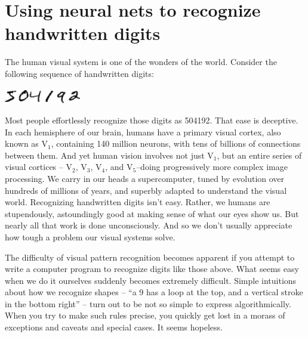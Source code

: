 \documentclass[a4paper,twoside,10pt]{book}
\begin{document}
\chapter{Using neural nets to recognize handwritten digits}

The human visual system is one of the wonders of the world. Consider the following sequence of handwritten digits:
\begin{center}
	\includegraphics[width=0.25\textwidth]{./figures/ch1/digits.png}
\end{center}
Most people effortlessly recognize those digits as 504192. That ease is deceptive. In each hemisphere of our brain, humans have a primary visual cortex, also known as V$_1$, containing 140 million neurons, with tens of billions of connections between them. And yet human vision involves not just V$_1$, but an entire series of visual cortices -- V$_2$, V$_3$, V$_4$, and V$_5$--doing progressively more complex image processing. We carry in our heads a supercomputer, tuned by evolution over hundreds of millions of years, and superbly adapted to understand the visual world. Recognizing handwritten digits isn't easy. Rather, we humans are stupendously, astoundingly good at making sense of what our eyes show us. But nearly all that work is done unconsciously. And so we don't usually appreciate how tough a problem our visual systems solve.

The difficulty of visual pattern recognition becomes apparent if you attempt to write a computer program to recognize digits like those above. What seems easy when we do it ourselves suddenly becomes extremely difficult. Simple intuitions about how we recognize shapes -- ``a 9 has a loop at the top, and a vertical stroke in the bottom right'' -- turn out to be not so simple to express algorithmically. When you try to make such rules precise, you quickly get lost in a morass of exceptions and caveats and special cases. It seems hopeless.
\end{document}

